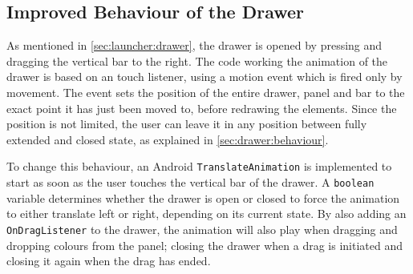 \subsection{Improved Behaviour of the Drawer}\label{sec:developments:drawerimprovements}
As mentioned in \cref{sec:launcher:drawer}, the drawer is opened by pressing and dragging the vertical bar to the right.
The code working the animation of the drawer is based on an touch listener, using a motion event which is fired only by movement.
The event sets the position of the entire drawer, panel and bar to the exact point it has just been moved to, before redrawing the elements.
Since the position is not limited, the user can leave it in any position between fully extended and closed state, as explained in \cref{sec:drawer:behaviour}.

To change this behaviour, an Android \lstinline{TranslateAnimation} is implemented to start as soon as the user touches the vertical bar of the drawer.
A \lstinline{boolean} variable determines whether the drawer is open or closed to force the animation to either translate left or right, depending on its current state.
By also adding an \lstinline{OnDragListener} to the drawer, the animation will also play when dragging and dropping colours from the panel; closing the drawer when a drag is initiated and closing it again when the drag has ended.